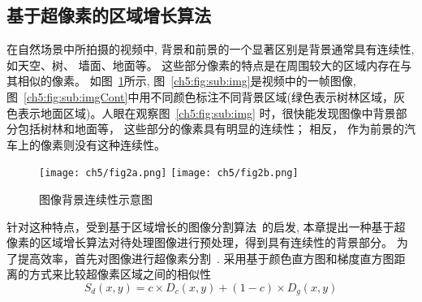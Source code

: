 \subsection{基于超像素的区域增长算法}
在自然场景中所拍摄的视频中, 背景和前景的一个显著区别是背景通常具有连续性, 如天空、树、 墙面、地面等。 这些部分像素的特点是在周围较大的区域内存在与其相似的像素。
 如图~\ref{ch5:fig:cont}所示, 图~\ref{ch5:fig:sub:img}是视频中的一帧图像, 图~\ref{ch5:fig:sub:imgCont}中用不同颜色标注不同背景区域(绿色表示树林区域，灰色表示地面区域)。人眼在观察图~\ref{ch5:fig:sub:img} 时，很快能发现图像中背景部分包括树林和地面等， 这些部分的像素具有明显的连续性； 相反， 作为前景的汽车上的像素则没有这种连续性。\par

 \begin{figure}[htb]
  \centering%
    {\texttt{[image: ch5/fig2a.png]}}%
 \hspace{1em}%
      {\texttt{[image: ch5/fig2b.png]}}

  \caption{图像背景连续性示意图}\label{ch5:fig:cont}
\end{figure}
 针对这种特点，受到基于区域增长的图像分割算法~\cite{seededRegionGrowing}的启发, 本章提出一种基于超像素的区域增长算法对待处理图像进行预处理，得到具有连续性的背景部分。 为了提高效率，首先对图像进行超像素分割~\cite{superpixel}. 采用基于颜色直方图和梯度直方图距离的方式来比较超像素区域之间的相似性
\begin{equation}\label{ch5:equ:distance}
S_d(x,y) = c \times D_c(x,y) + (1-c) \times D_g(x,y)
\end{equation}

